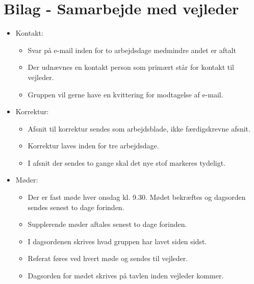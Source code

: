   \chapter{Bilag - Samarbejde med vejleder}
  \label{Bilag3}
  
   \begin{itemize}
	
	\item Kontakt:
	
	\begin{itemize}
		\item Svar på e-mail inden for to arbejdsdage medmindre andet er aftalt
		\item Der udnævnes en kontakt person som primært står for kontakt til vejleder.
		\item Gruppen vil gerne have en kvittering for modtagelse af e-mail.
	\end{itemize}
	
	\item Korrektur: 
	
	\begin{itemize}
		\item Afsnit til korrektur sendes som arbejdsblade, ikke færdigskrevne afsnit. 
		\item Korrektur laves inden for tre arbejdsdage.
		\item I afsnit der sendes to gange skal det nye stof markeres tydeligt.
	\end{itemize}
	
	\item Møder:
	
	\begin{itemize}
		\item Der er fast møde hver onsdag kl. 9.30. Mødet bekræftes og dagsorden sendes senest to dage forinden. 
		\item Supplerende møder aftales senest to dage forinden. 
		\item I dagsordenen skrives hvad gruppen har lavet siden sidst. 
		\item Referat føres ved hvert møde og sendes til vejleder. 
		\item Dagsorden for mødet skrives på tavlen inden vejleder kommer.
	\end{itemize}
	
\end{itemize}

\clearpage